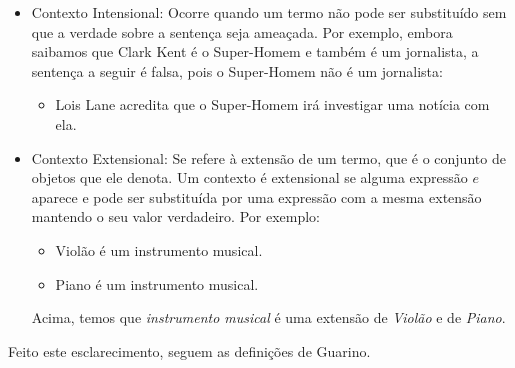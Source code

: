 \begin{itemize}
	\item Contexto Intensional: Ocorre quando um termo não pode ser substituído sem que a verdade sobre a sentença seja ameaçada. Por exemplo, embora saibamos que Clark Kent é o Super-Homem e também é um jornalista, a sentença a seguir é falsa, pois o Super-Homem não é um jornalista:
	\begin{itemize}
		\item Lois Lane acredita que o Super-Homem irá investigar uma notícia com ela. 
	\end{itemize}
	\item Contexto Extensional: Se refere à extensão de um termo, que é o conjunto de objetos que ele denota. Um contexto é extensional se alguma expressão $ e $ aparece e pode ser substituída por uma expressão com a mesma extensão mantendo o seu valor verdadeiro. Por exemplo: 
	\begin{itemize}
		\item Violão é um instrumento musical.
		\item Piano é um instrumento musical.
	\end{itemize}
	Acima, temos que \textit{instrumento musical} é uma extensão de \textit{Violão} e de \textit{Piano}.	
\end{itemize}

Feito este esclarecimento, seguem as definições de Guarino.


